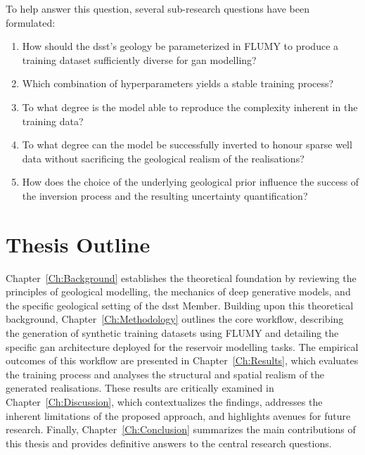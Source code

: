 To help answer this question, several sub-research questions have been formulated:
\begin{enumerate}
    \item How should the \gls{dsst}’s geology be parameterized in FLUMY to produce a training dataset sufficiently diverse for \gls{gan} modelling?
    \item Which combination of hyperparameters yields a stable training process?
    \item To what degree is the model able to reproduce the complexity inherent in the training data?
    \item To what degree can the model be successfully inverted to honour sparse well data without sacrificing the geological realism of the realisations?
    \item How does the choice of the underlying geological prior influence the success of the inversion process and the resulting uncertainty quantification?
\end{enumerate}

\section{Thesis Outline}
Chapter~\ref{Ch:Background} establishes the theoretical foundation by reviewing the principles of geological modelling, the mechanics of deep generative models, and the specific geological setting of the \gls{dsst} Member. Building upon this theoretical background, Chapter~\ref{Ch:Methodology} outlines the core workflow, describing the generation of synthetic training datasets using FLUMY and detailing the specific \gls{gan} architecture deployed for the reservoir modelling tasks. The empirical outcomes of this workflow are presented in Chapter~\ref{Ch:Results}, which evaluates the training process and analyses the structural and spatial realism of the generated realisations. These results are critically examined in Chapter~\ref{Ch:Discussion}, which contextualizes the findings, addresses the inherent limitations of the proposed approach, and highlights avenues for future research. Finally, Chapter~\ref{Ch:Conclusion} summarizes the main contributions of this thesis and provides definitive answers to the central research questions.